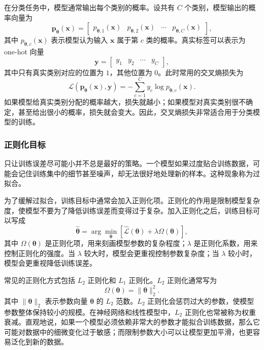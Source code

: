 在分类任务中，模型通常输出每个类别的概率。设共有 $C$ 个类别，模型输出的概率向量为
\[
\mathbf{p}_{\boldsymbol{\theta}}(\mathbf{x})
=
\begin{bmatrix}
p_{\boldsymbol{\theta},1}(\mathbf{x}) &
p_{\boldsymbol{\theta},2}(\mathbf{x}) &
\cdots &
p_{\boldsymbol{\theta},C}(\mathbf{x})
\end{bmatrix},
\]
其中 $p_{\boldsymbol{\theta},c}(\mathbf{x})$ 表示模型认为输入 $\mathbf{x}$ 属于第 $c$ 类的概率。真实标签可以表示为 one-hot 向量
\[
\mathbf{y}
=
\begin{bmatrix}
y_1 & y_2 & \cdots & y_C
\end{bmatrix},
\]
其中只有真实类别对应的位置为 $1$，其他位置为 $0$。此时常用的交叉熵损失为
\[
\mathcal{L}
\left(
\mathbf{p}_{\boldsymbol{\theta}}(\mathbf{x}),
\mathbf{y}
\right)
=
-
\sum_{c=1}^{C}
y_c
\log
p_{\boldsymbol{\theta},c}(\mathbf{x}).
\]
如果模型给真实类别分配的概率越大，损失就越小；如果模型对真实类别很不确定，甚至给出很小的概率，损失就会变大。因此，交叉熵损失非常适合用于分类模型的训练。

\subsubsection{正则化目标}

只让训练误差尽可能小并不总是最好的策略。一个模型如果过度贴合训练数据，可能会记住训练集中的细节甚至噪声，却无法很好地处理新的样本。这种现象称为过拟合。

为了缓解过拟合，训练目标中通常会加入正则化项。正则化的作用是限制模型复杂度，使模型不要为了降低训练误差而变得过于复杂。加入正则化之后，训练目标可以写成
\[
\hat{\boldsymbol{\theta}}
=
\arg\min_{\boldsymbol{\theta}}
\left[
\hat{\mathcal{L}}(\boldsymbol{\theta})
+
\lambda \Omega(\boldsymbol{\theta})
\right],
\]
其中 $\Omega(\boldsymbol{\theta})$ 是正则化项，用来刻画模型参数的复杂程度；$\lambda$ 是正则化系数，用来控制正则化的强度。当 $\lambda$ 较大时，模型会更重视控制参数复杂度；当 $\lambda$ 较小时，模型会更重视降低训练误差。

常见的正则化方式包括 $L_2$ 正则化和 $L_1$ 正则化。$L_2$ 正则化通常写为
\[
\Omega(\boldsymbol{\theta})
=
\|\boldsymbol{\theta}\|_2^2.
\]
其中 $\|\boldsymbol{\theta}\|_2$ 表示参数向量 $\boldsymbol{\theta}$ 的 $L_2$ 范数。$L_2$ 正则化会惩罚过大的参数，使模型参数整体保持较小的规模。在神经网络和线性模型中，$L_2$ 正则化也常被称为权重衰减。直观地说，如果一个模型必须依赖非常大的参数才能拟合训练数据，那么它可能对数据中的细微变化过于敏感；而限制参数大小可以让模型更加平滑，也更容易泛化到新的数据。

